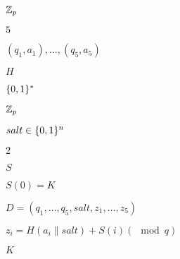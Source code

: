 \documentclass[10pt]{book}
\begin{document}
\begin{mdSnippets}
\begin{mdInlineSnippet}[1d845fd5c95058f0c19a8af900c11e16]
$\mathbb{Z}_p$\end{mdInlineSnippet}%
\begin{mdInlineSnippet}[e4da3b7fbbce2345d7772b0674a318d5]%
$5$\end{mdInlineSnippet}%
\begin{mdInlineSnippet}%
$(q_1,a_1),\ldots,(q_5,a_5)$\end{mdInlineSnippet}%
\begin{mdInlineSnippet}[c1d9f50f86825a1a2302ec2449c17196]%
$H$\end{mdInlineSnippet}%
\begin{mdInlineSnippet}%
$\{0,1\}^*$\end{mdInlineSnippet}%
\begin{mdInlineSnippet}[1d845fd5c95058f0c19a8af900c11e16]%
$\mathbb{Z}_p$\end{mdInlineSnippet}%
\begin{mdInlineSnippet}[ffc773c46c3472088d8152c425c3e439]%
$salt\in\{0,1\}^n$\end{mdInlineSnippet}%
\begin{mdInlineSnippet}[c81e728d9d4c2f636f067f89cc14862c]%
$2$\end{mdInlineSnippet}%
\begin{mdInlineSnippet}%
$S$\end{mdInlineSnippet}%
\begin{mdInlineSnippet}[ab2059400dbc6be1db34df0bb98967cd]%
$S(0)=K$\end{mdInlineSnippet}%
\begin{mdInlineSnippet}%
$D=(q_1,\ldots,q_5,salt,z_1,\ldots,z_5)$\end{mdInlineSnippet}%
\begin{mdInlineSnippet}[7c314508e02a41f95141c26f9bf7a95c]%
$z_i = H(a_i\|salt)+S(i) (\mod q)$\end{mdInlineSnippet}%
\begin{mdInlineSnippet}[a5f3c6a11b03839d46af9fb43c97c188]%
$K$\end{mdInlineSnippet}%
\begin{mdInlineSnippet}[d133b6608de3a6748dc3bb40219694e9]%

\end{mdInlineSnippet}
\end{mdSnippets}
\end{document}
